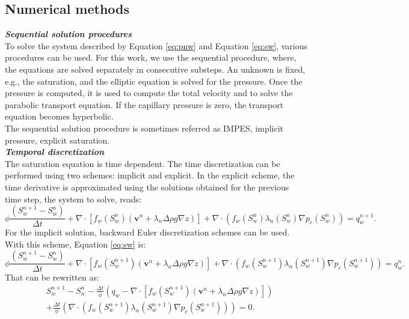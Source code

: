 \documentclass[12pt]{article}
\begin{document}
\subsection{Numerical methods}
\emph{\textbf{Sequential solution procedures}}\\
To solve the system described by Equation \eqref{eq:pnw} and Equation \eqref{eq:sw}, various procedures can be used. For this work, we use the sequential procedure, where,  the equations are solved separately in consecutive substeps. An unknown is fixed, e.g., the saturation, and the elliptic equation is solved for the pressure. Once the pressure is computed, it is used to compute the total velocity and to solve the parabolic transport equation. 
If the capillary pressure is zero, the transport equation becomes hyperbolic.\\
The sequential solution procedure is sometimes referred as IMPES, implicit pressure, explicit saturation. \\
\emph{\textbf{Temporal discretization}}\\
The saturation equation is time dependent. The time discretization can be performed using two schemes: implicit and explicit. In the explicit scheme, the time derivative is approximated using the solutions obtained for the previous time step, the system to solve, reads:
\begin{equation}\label{eq:wsate}
 \phi\frac{( {S}_{w}^{n+1}-{S}_{w}^n)}{\Delta t}+\nabla \cdot [f_w({S}_{w}^n)( \mathbf{v}^n+\lambda_n\Delta  \rho g\nabla z)]+\nabla \cdot(f_w({S}_{w}^n)\lambda_n({S}_{w}^n)\nabla p_c({S}_{w}^n))= q_w^{n+1}.
\end{equation}
For the implicit solution, backward Euler discretization schemes can be used. With this scheme, Equation \eqref{eq:sw} is:
\begin{equation}\label{eq:wsati}
 \phi\frac{( {S}_{w}^{n+1}-{S}_{w}^n)}{\Delta t}+\nabla \cdot [f_w({S}_{w}^{n+1})( \mathbf{v}^n+\lambda_n\Delta  \rho g\nabla z)]+\nabla \cdot(f_w({S}_{w}^{n+1})\lambda_n({S}_{w}^{n+1})\nabla p_c({S}_{w}^{n+1}))= q_w^n.
\end{equation}
That can be rewritten as:
\begin{align}\label{eq:wsati1}
 &{S}_{w}^{n+1}-{S}_{w}^n-\frac{\Delta t}{\phi}\left(q_w-\nabla \cdot [f_w({S}_{w}^{n+1})( \mathbf{v}^n+\lambda_n\Delta  \rho g\nabla z)]\right)\nonumber \\ 
 &+\frac{\Delta t}{\phi}\left(\nabla\cdot(f_w({S}_{w}^{n+1})\lambda_n({S}_{w}^{n+1})\nabla p_c({S}_{w}^{n+1}))\right)=0.
\end{align}
\end{document}

